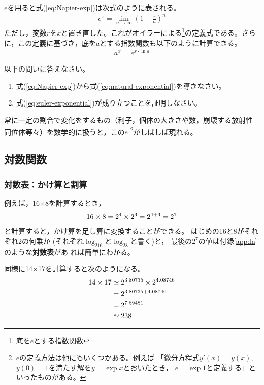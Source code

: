 \documentclass[twocolumn,11pt]{jarticle}
\begin{document}
$e$を用ると式(\ref{eq:Napier-exp})は次式のように表される。
\begin{align}
	\label{eq:natural-exponential}
	e^x = \lim_{n\to\infty} \left( 1 + \frac{x}{n} \right)^n
\end{align}
ただし，変数$r$を$x$と置き直した。これがオイラーによる\footnote{底を$e$とする指数関数}の定義式である。さらに，この定義に基づき，底を$a$とする指数関数も以下のように計算できる。
\begin{align}
	\label{eq:euler-exponential}
	a^x=e^{x\cdot \ln a}
\end{align}

\nquestion 以下の問いに答えなさい。
\begin{enumerate}
\item 式(\ref{eq:Napier-exp})から式(\ref{eq:natural-exponential})を導きなさい。
\item 式(\ref{eq:euler-exponential})が成り立つことを証明しなさい。
\end{enumerate}
\comment
常に一定の割合で変化をするもの（利子，個体の大きさや数，崩壊する放射性
同位体等々）を数学的に扱うと，この$e$
\footnote{$e$の定義方法は他にもいくつかある。例えば
「微分方程式$y'(x)=y(x)$, $y(0)=1$を満たす解を$y=\exp x$とおいたとき，
$e=\exp 1$と定義する」といったものがある。}がしばしば現れる。

\subsection{対数関数}

\subsubsection{対数表：かけ算と割算}
例えば，16×8を計算するとき，
\begin{align}
  16\times 8=2^4\times 2^3=2^{4+3}=2^7\notag
\end{align}
と計算すると，かけ算を足し算に変換することができる。
はじめの16と8がそれぞれ2の何乗か
(それぞれ$\log_216$と$\log_28$と書く)と，
最後の$2^7$の値は付録\ref{app:ln}のような\textbf{対数表}があ
れば簡単にわかる。

同様に14×17を計算すると次のようになる。
\begin{align}
  14\times 17&\simeq 2^{3.80735}\times 2^{4.08746}\notag\\
  &=2^{3.80735+4.08746}\notag\\
  &=2^{7.89481}\notag\\
  &\simeq 238\notag
\end{align}
\end{document}
